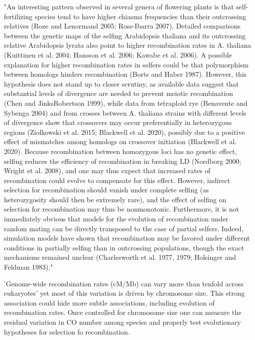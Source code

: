 \documentclass{article}
\begin{document}
"An interesting pattern observed in several genera of flowering plants is that self-fertilizing species tend to have higher chiasma frequencies than their outcrossing relatives (Roze and Lenormand 2005; Ross-Ibarra 2007). Detailed comparisons between the genetic maps of the selfing Arabidopsis thaliana and its outcrossing relative Arabidopsis lyrata also point to higher recombination rates in A. thaliana (Kuittinen et al. 2004; Hansson et al. 2006; Kawabe et al. 2006). A possible explanation for higher recombination rates in selfers could be that polymorphism between homologs hinders recombination (Borts and Haber 1987). However, this hypothesis does not stand up to closer scrutiny, as available data suggest that substantial levels of divergence are needed to prevent meiotic recombination (Chen and JinksRobertson 1999), while data from tetraploid rye (Benavente and Sybenga 2004) and from crosses between A. thaliana strains with different levels of divergence show that crossovers may occur preferentially in heterozygous regions (Ziolkowski et al. 2015; Blackwell et al. 2020), possibly due to a positive effect of mismatches among homologs on crossover initiation (Blackwell et al. 2020). Because recombination between homozygous loci has no genetic effect, selfing reduces the efficiency of recombination in breaking LD (Nordborg 2000; Wright et al. 2008), and one may thus expect that increased rates of recombination could evolve to compensate for this effect. However, indirect selection for recombination should vanish under complete selfing (as heterozygosity should then be extremely rare), and the effect of selfing on selection for recombination may thus be nonmonotonic. Furthermore, it is not immediately obvious that models for the evolution of recombination under random mating can be directly transposed to the case of partial selfers. Indeed, simulation models have shown that recombination may be favored under different conditions in partially selfing than in outcrossing populations, though the exact mechanisms remained unclear (Charlesworth et al. 1977, 1979; Holsinger and Feldman 1983)."

'Genome-wide recombination rates (cM/Mb) can vary more than tenfold across eukaryotes' yet most of this variation is driven by chromosome size. This strong association could hide more subtle associations, including evolution of recombination rates. Once controlled for chromosome size one can measure the residual variation in CO number among species and properly test evolutionary hypotheses for selection fo recombination.
\end{document}
